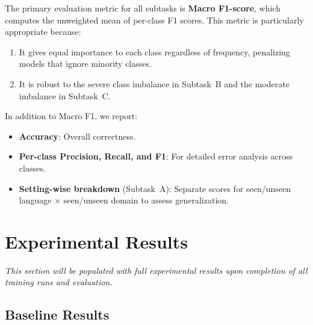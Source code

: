 \documentclass[11pt]{article}
\begin{document}
The primary evaluation metric for all subtasks is \textbf{Macro F1-score}, which computes the unweighted mean of per-class F1 scores. This metric is particularly appropriate because:
\begin{enumerate}
    \item It gives equal importance to each class regardless of frequency, penalizing models that ignore minority classes.
    \item It is robust to the severe class imbalance in Subtask~B and the moderate imbalance in Subtask~C.
\end{enumerate}

In addition to Macro F1, we report:
\begin{itemize}
    \item \textbf{Accuracy}: Overall correctness.
    \item \textbf{Per-class Precision, Recall, and F1}: For detailed error analysis across classes.
    \item \textbf{Setting-wise breakdown} (Subtask~A): Separate scores for seen/unseen language $\times$ seen/unseen domain to assess generalization.
\end{itemize}

\section{Experimental Results}
\label{sec:results}

\textit{This section will be populated with full experimental results upon completion of all training runs and evaluation.}

\subsection{Baseline Results}
\end{document}
